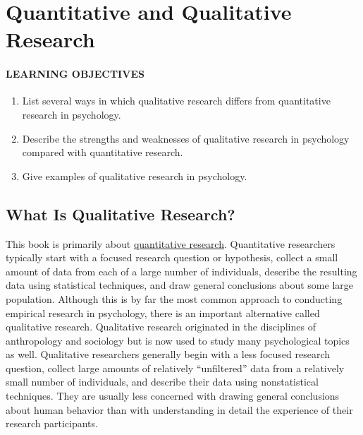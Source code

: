 \documentclass[
]{krantz}
\providecommand{\tightlist}{%
  \setlength{\itemsep}{0pt}\setlength{\parskip}{0pt}}
\begin{document}
\hypertarget{quantitative-and-qualitative-research}{%
\section{Quantitative and Qualitative Research}\label{quantitative-and-qualitative-research}}

\hypertarget{learning-objectives-5}{%
\paragraph*{LEARNING OBJECTIVES}\label{learning-objectives-5}}

\begin{enumerate}
\def\labelenumi{\arabic{enumi}.}
\tightlist
\item
  List several ways in which qualitative research differs from quantitative research in psychology.
\item
  Describe the strengths and weaknesses of qualitative research in psychology compared with quantitative research.
\item
  Give examples of qualitative research in psychology.
\end{enumerate}

\hypertarget{what-is-qualitative-research}{%
\subsection*{What Is Qualitative Research?}\label{what-is-qualitative-research}}


This book is primarily about \protect\hyperlink{quantitative-research}{quantitative research}. Quantitative researchers typically start with a focused research question or hypothesis, collect a small amount of data from each of a large number of individuals, describe the resulting data using statistical techniques, and draw general conclusions about some large population. Although this is by far the most common approach to conducting empirical research in psychology, there is an important alternative called qualitative research. Qualitative research originated in the disciplines of anthropology and sociology but is now used to study many psychological topics as well. Qualitative researchers generally begin with a less focused research question, collect large amounts of relatively ``unfiltered'' data from a relatively small number of individuals, and describe their data using nonstatistical techniques. They are usually less concerned with drawing general conclusions about human behavior than with understanding in detail the experience of their research participants.
\end{document}
